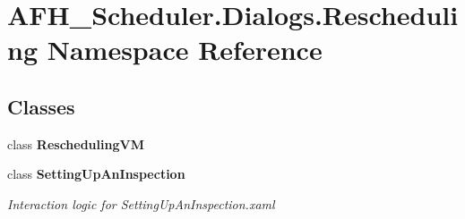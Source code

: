 \section{A\+F\+H\+\_\+\+Scheduler.\+Dialogs.\+Rescheduling Namespace Reference}
\label{namespace_a_f_h___scheduler_1_1_dialogs_1_1_rescheduling}
\subsection*{Classes}
\begin{DoxyCompactItemize}
\item 
class \textbf{ Rescheduling\+VM}
\item 
class \textbf{ Setting\+Up\+An\+Inspection}
\begin{DoxyCompactList}\small\item\em Interaction logic for Setting\+Up\+An\+Inspection.\+xaml \end{DoxyCompactList}\end{DoxyCompactItemize}
